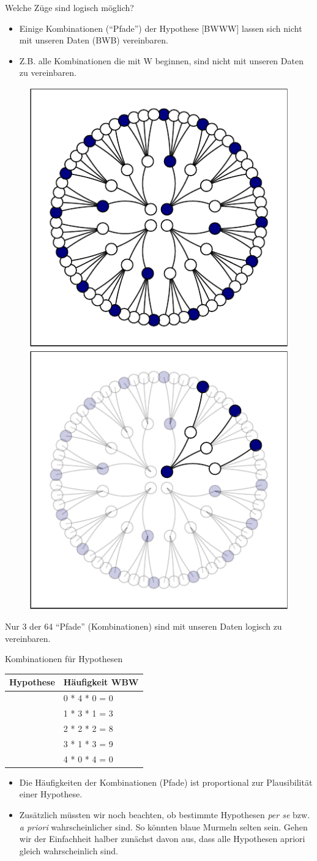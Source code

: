 \documentclass[
  ngerman,
  ignorenonframetext,
]{beamer}
\providecommand{\tightlist}{%
  \setlength{\itemsep}{0pt}\setlength{\parskip}{0pt}}
\begin{document}
\begin{frame}{Welche Züge sind logisch möglich?}
\protect\hypertarget{welche-zuxfcge-sind-logisch-muxf6glich}{}
\begin{itemize}
\tightlist
\item
  Einige Kombinationen (``Pfade'') der Hypothese {[}BWWW{]} lassen sich
  nicht mit unseren Daten (BWB) vereinbaren.
\item
  Z.B. alle Kombinationen die mit W beginnen, sind nicht mit unseren
  Daten zu vereinbaren.
\end{itemize}

\begin{figure}[H]
\includegraphics[width=0.33\linewidth]{unnamed-chunk-10-1} \includegraphics[width=0.33\linewidth]{unnamed-chunk-10-2} \end{figure}

Nur 3 der 64 ``Pfade'' (Kombinationen) sind mit unseren Daten logisch zu
vereinbaren.
\end{frame}

\begin{frame}{Kombinationen für Hypothesen}
\protect\hypertarget{kombinationen-fuxfcr-hypothesen}{}
\begin{tabular}{l|l}
\hline
Hypothese & Häufigkeit WBW\\
\hline
[W W W W] & 0 * 4 * 0 = 0\\
\hline
[B W W W] & 1 * 3 * 1 = 3\\
\hline
[B B W W] & 2 * 2 * 2 = 8\\
\hline
[B B B W] & 3 * 1 * 3 = 9\\
\hline
[B B B B] & 4 * 0 * 4 = 0\\
\hline
\end{tabular}

\begin{itemize}
\item
  Die Häufigkeiten der Kombinationen (Pfade) ist proportional zur
  Plausibilität einer Hypothese.
\item
  Zusätzlich müssten wir noch beachten, ob bestimmte Hypothesen
  \emph{per se} bzw. \emph{a priori} wahrscheinlicher sind. So könnten
  blaue Murmeln selten sein. Gehen wir der Einfachheit halber zunächst
  davon aus, dass alle Hypothesen apriori gleich wahrscheinlich sind.
\end{itemize}
\end{frame}
\end{document}
